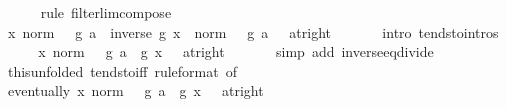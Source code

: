 \begin{isabellebody}
\ \ \ \ \isamarkupfalse%
\ {\isacharparenleft}{\kern0pt}rule\ filterlim{\isacharunderscore}{\kern0pt}compose{\isacharparenright}{\kern0pt}\isanewline
\ \ \isamarkupfalse%
\ \isamarkupfalse%
\ {\isachardoublequoteopen}{\isacharparenleft}{\kern0pt}{\isacharparenleft}{\kern0pt}{\isasymlambda}x{\isachardot}{\kern0pt}\ norm\ {\isacharparenleft}{\kern0pt}{}\ {\isacharminus}{\kern0pt}\ g\ a\ {\isacharasterisk}{\kern0pt}\ inverse\ {\isacharparenleft}{\kern0pt}g\ x{\isacharparenright}{\kern0pt}{\isacharparenright}{\kern0pt}{\isacharparenright}{\kern0pt}\ {\isasymlonglongrightarrow}\ norm\ {\isacharparenleft}{\kern0pt}{}\ {\isacharminus}{\kern0pt}\ g\ a\ {\isacharasterisk}{\kern0pt}\ {}{\isacharparenright}{\kern0pt}{\isacharparenright}{\kern0pt}\ {\isacharparenleft}{\kern0pt}at{\isacharunderscore}{\kern0pt}right\ {}{\isacharparenright}{\kern0pt}{\isachardoublequoteclose}\isanewline
\ \ \ \ \isamarkupfalse%
\ {\isacharparenleft}{\kern0pt}intro\ tendsto{\isacharunderscore}{\kern0pt}intros{\isacharparenright}{\kern0pt}\isanewline
\ \ \isamarkupfalse%
\ \isamarkupfalse%
\ {\isachardoublequoteopen}{\isacharparenleft}{\kern0pt}{\isacharparenleft}{\kern0pt}{\isasymlambda}x{\isachardot}{\kern0pt}\ norm\ {\isacharparenleft}{\kern0pt}{}\ {\isacharminus}{\kern0pt}\ g\ a\ {\isacharslash}{\kern0pt}\ g\ x{\isacharparenright}{\kern0pt}{\isacharparenright}{\kern0pt}\ {\isasymlonglongrightarrow}\ {}{\isacharparenright}{\kern0pt}\ {\isacharparenleft}{\kern0pt}at{\isacharunderscore}{\kern0pt}right\ {}{\isacharparenright}{\kern0pt}{\isachardoublequoteclose}\isanewline
\ \ \ \ \isamarkupfalse%
\ {\isacharparenleft}{\kern0pt}simp\ add{\isacharcolon}{\kern0pt}\ inverse{\isacharunderscore}{\kern0pt}eq{\isacharunderscore}{\kern0pt}divide{\isacharparenright}{\kern0pt}\isanewline
\ \ \isamarkupfalse%
\ this{\isacharbrackleft}{\kern0pt}unfolded\ tendsto{\isacharunderscore}{\kern0pt}iff{\isacharcomma}{\kern0pt}\ rule{\isacharunderscore}{\kern0pt}format{\isacharcomma}{\kern0pt}\ of\ {}{\isacharbrackright}{\kern0pt}\isanewline
\ \ \isamarkupfalse%
\ {\isachardoublequoteopen}eventually\ {\isacharparenleft}{\kern0pt}{\isasymlambda}x{\isachardot}{\kern0pt}\ norm\ {\isacharparenleft}{\kern0pt}{}\ {\isacharminus}{\kern0pt}\ g\ a\ {\isacharslash}{\kern0pt}\ g\ x{\isacharparenright}{\kern0pt}\ {\isacharless}{\kern0pt}\ {}{\isacharparenright}{\kern0pt}\ {\isacharparenleft}{\kern0pt}at{\isacharunderscore}{\kern0pt}right\ {}{\isacharparenright}{\kern0pt}{\isachardoublequoteclose}\isanewline

\end{isabellebody}
